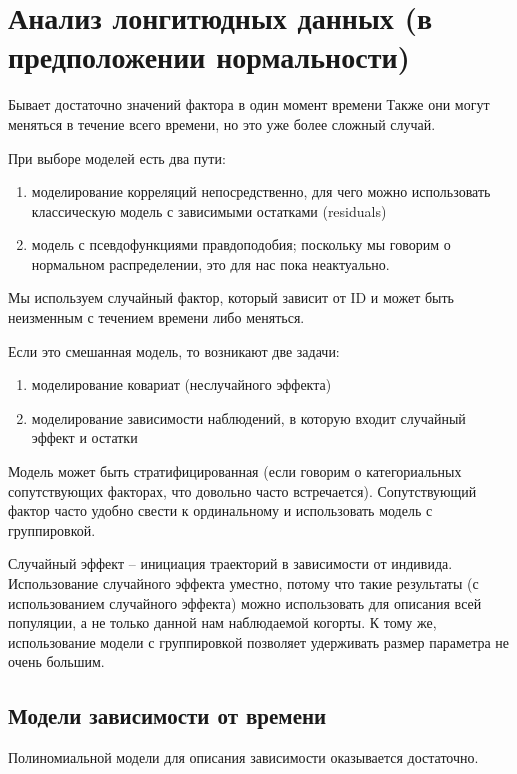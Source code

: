 \documentclass[main.tex]{subfiles}
\begin{document}
\section{Анализ лонгитюдных данных (в предположении нормальности)}

Бывает достаточно значений фактора в один момент времени
Также они могут меняться в течение всего времени, но это уже более сложный случай.

При выборе моделей есть два пути:

\begin{enumerate}[noitemsep]
	\item моделирование корреляций непосредственно, для чего можно использовать классическую модель с зависимыми остатками (residuals)
	\item модель с псевдофункциями правдоподобия; поскольку мы говорим о нормальном распределении, это для нас пока неактуально.
\end{enumerate}

Мы используем случайный фактор, который зависит от ID и может быть неизменным с течением времени либо меняться.

Если это смешанная модель, то возникают две задачи:

\begin{enumerate}[noitemsep]
	\item моделирование ковариат (неслучайного эффекта)
	\item моделирование зависимости наблюдений, в которую входит случайный эффект и остатки
\end{enumerate}

Модель может быть стратифицированная (если говорим о категориальных сопутствующих факторах, что довольно часто встречается).
Сопутствующий фактор часто удобно свести к ординальному и использовать модель с группировкой.

Случайный эффект -- инициация траекторий в зависимости от индивида.
Использование случайного эффекта уместно, потому что такие результаты (с использованием случайного эффекта) можно использовать для описания всей популяции, а не только данной нам наблюдаемой когорты.
К тому же, использование модели с группировкой позволяет удерживать размер параметра не очень большим.

\subsection{Модели зависимости от времени}

Полиномиальной модели для описания зависимости оказывается достаточно.
\end{document}
